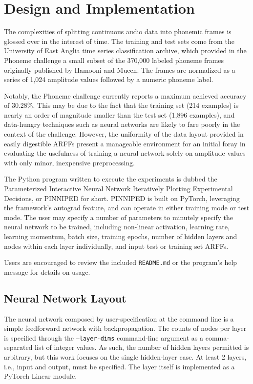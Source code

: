 \documentclass[10pt,epsf]{article}
\begin{document}
\section{Design and Implementation}{
  The complexities of splitting continuous audio data into phonemic frames is glossed
  over in the interest of time. The training and test sets come from the University
  of East Anglia time series classification archive\autocite{ueamvtsca}\autocite{Phoneme},
  which provided in the Phoneme challenge a small subset of the 370,000 labeled phoneme frames originally
  published by Hamooni and Mueen\autocite{DDHCPTS}. The frames are normalized as a series
  of 1,024 amplitude values followed by a numeric phoneme label.

  Notably, the Phoneme challenge currently reports a maximum achieved accuracy of 30.28\%.
  This may be due to the fact that the training set (214 examples) is nearly an order of magnitude smaller than
  the test set (1,896 examples), and data-hungry techniques such as neural networks are likely to fare
  poorly in the context of the challenge. However, the uniformity of the data layout provided in easily
  digestible ARFFs\autocite{scipyloadarff} present a manageable environment for an initial foray in
  evaluating the usefulness of training a neural network solely on amplitude values with only
  minor, inexpensive preprocessing.

  The Python program written to execute the experiments is dubbed the
  Parameterized Interactive Neural Network Iteratively Plotting Experimental Decisions, or PINNIPED for short.
  PINNIPED is built on PyTorch\autocite{torchnnref}\autocite{torchnntut},
  leveraging the framework's autograd feature, and can operate in either training mode or test mode.
  The user may specify a number of parameters to minutely specify the neural network to be trained,
  including non-linear activation, learning rate, learning momentum, batch size, training epochs,
  number of hidden layers and nodes within each layer individually, and input test or training set ARFFs.

  Users are encouraged to review the included \texttt{README.md} or the program's help message
  for details on usage.

  \subsection{Neural Network Layout}{
    The neural network composed by user-specification at the command line is a simple feedforward
    network with backpropagation\autocite[284-296]{DHS}. The counts of nodes per layer is specified
    through the \texttt{--layer-dims} command-line argument as a comma-separated list of integer values.
    As such, the number of hidden layers permitted is arbitrary, but this work focuses on the single
    hidden-layer case. At least 2 layers, i.e., input and output, must be specified. The layer itself
    is implemented as a PyTorch Linear module.

}}
\end{document}
